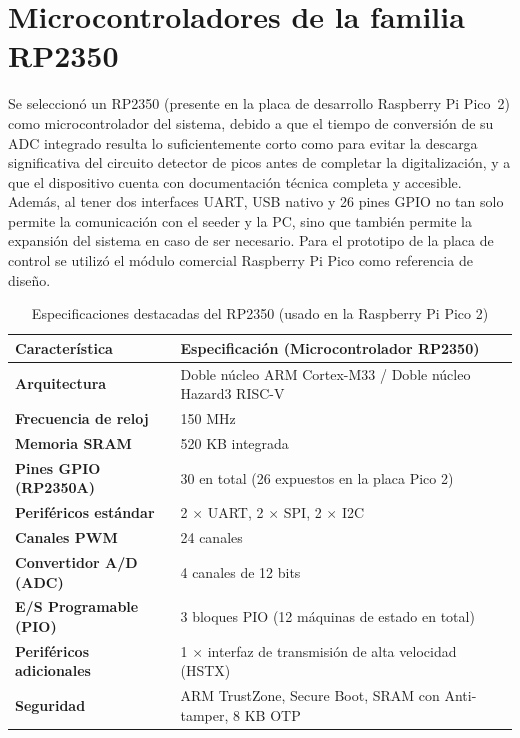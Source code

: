\section{Microcontroladores de la familia RP2350}
\label{sec:rp2350}

Se seleccionó un RP2350 (presente en la placa de desarrollo Raspberry Pi Pico~2) como microcontrolador del sistema, debido a que el tiempo de conversión de su ADC integrado resulta lo suficientemente corto como para evitar la descarga significativa del circuito detector de picos antes de completar la digitalización, y a que el dispositivo cuenta con documentación técnica completa y accesible. Además, al tener dos interfaces UART, USB nativo y 26 pines GPIO no tan solo permite la comunicación con el seeder y la PC, sino que también permite la expansión del sistema en caso de ser necesario. Para el prototipo de la placa de control se utilizó el módulo comercial Raspberry Pi Pico como referencia de diseño.

\begin{table}[htbp]
\centering
\renewcommand{\arraystretch}{1.3}
\begin{tabularx}{0.9\textwidth}{>{\bfseries}l X}
\toprule
Característica & \textbf{Especificación (Microcontrolador RP2350)} \\
\midrule
Arquitectura & Doble núcleo ARM Cortex-M33 / Doble núcleo Hazard3 RISC-V \\
Frecuencia de reloj & 150 MHz \\
Memoria SRAM & 520 KB integrada \\
Pines GPIO (RP2350A) & 30 en total (26 expuestos en la placa Pico 2) \\
Periféricos estándar & 2 $\times$ UART, 2 $\times$ SPI, 2 $\times$ I2C \\
Canales PWM & 24 canales \\
Convertidor A/D (ADC) & 4 canales de 12 bits \\
E/S Programable (PIO) & 3 bloques PIO (12 máquinas de estado en total) \\
Periféricos adicionales & 1 $\times$ interfaz de transmisión de alta velocidad (HSTX) \\
Seguridad & ARM TrustZone, Secure Boot, SRAM con Anti-tamper, 8 KB OTP \\
\bottomrule
\end{tabularx}
\vspace{0.2cm}
\caption{Especificaciones destacadas del RP2350 (usado en la Raspberry Pi Pico 2)}
\label{tab:rp2350}
\end{table}



